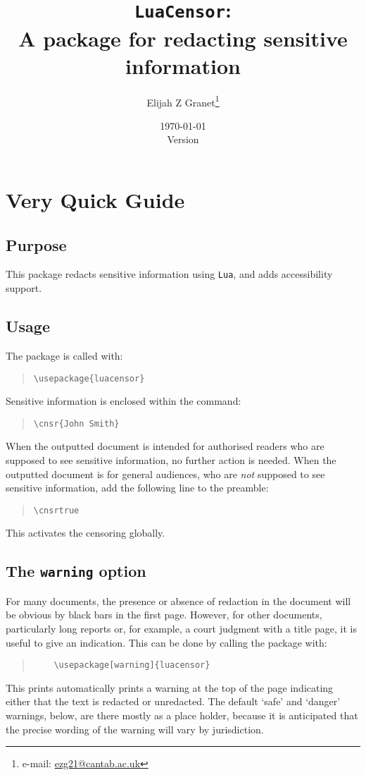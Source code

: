 \documentclass{article}
\date{\today\\\smallskip\ttfamily Version \luacensorversionnumber}
\author{Elijah Z Granet\thanks{e-mail: \href{mailto:ezg21@cantab.ac.uk}{\ttfamily ezg21@cantab.ac.uk}}}
\title{\texttt{LuaCensor}:\\A package for redacting sensitive information}
\begin{document}
\maketitle
\tableofcontents
\section{Very Quick Guide}
\subsection{Purpose}
This package redacts sensitive information using \texttt{Lua}, and adds accessibility support.
\subsection{Usage}
The package is called with:
\begin{quote}
\begin{verbatim}
\usepackage{luacensor}
\end{verbatim}
\end{quote}

Sensitive information is enclosed within the command:
\begin{quote}
\begin{verbatim}
\cnsr{John Smith}
\end{verbatim}
\end{quote}

When the outputted document is intended for authorised readers who are supposed to see sensitive information, no further action is needed.  When the outputted document is for general audiences, who are \textit{not} supposed to see sensitive information, add the following line to the preamble:
\begin{quote}
\begin{verbatim}
\cnsrtrue
\end{verbatim}
\end{quote}

This activates the censoring globally.
\subsection{The \texttt{\color{red}warning} option}
For many documents, the presence or absence of redaction in the document will be obvious by black bars in the first page. However, for other documents, particularly long reports or, for example, a court judgment with a title page, it is useful to give an indication.  This can be done by calling the package with:
\begin{quote}
	\begin{verbatim}
	\usepackage[warning]{luacensor}
	\end{verbatim}
\end{quote}
	This prints automatically prints a warning at the top of the page indicating either that the text is redacted or unredacted.  The default `safe' and `danger' warnings, below, are there mostly as a place holder, because it is anticipated that the precise wording of the warning will vary by jurisdiction.\clearpage
\end{document}

